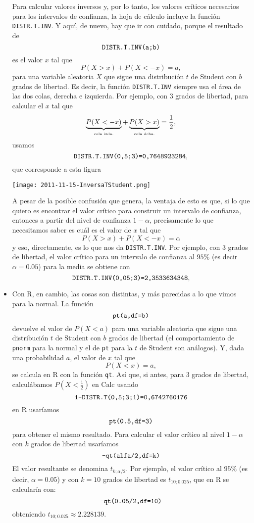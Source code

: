 \begin{itemize}
         Para calcular valores inversos y, por lo tanto, los valores críticos necesarios para los intervalos de confianza, la hoja de cálculo incluye la función {\tt DISTR.T.INV}. Y aquí, de nuevo, hay que ir con cuidado, porque el resultado de
         \[\mbox{\tt DISTR.T.INV(a;b)}\]
         es el valor $x$ tal que
         \[P(X>x)+P(X<-x)=a,\]
         para una variable aleatoria $X$ que sigue una distribución $t$ de Student con $b$ grados de libertad. Es decir, la función {\tt DISTR.T.INV} {\sf siempre usa el área de las dos colas, derecha e izquierda}. Por ejemplo,
         con 3 grados de libertad, para calcular el $x$ tal que
         \[\underbrace{P(X<-x)}_{\mbox{\tiny cola izda.}}+\underbrace{P(X>x)}_{\mbox{\tiny cola dcha.}}=\frac{1}{2},\]
         usamos
         \[\mbox{\tt DISTR.T.INV(0,5;3)=0,7648923284},\]
         que corresponde a esta figura
         \begin{center}
         \texttt{[image: 2011-11-15-InversaTStudent.png]}
         \end{center}
         A pesar de la posible confusión que genera, la ventaja de esto es que, si lo que quiero es encontrar el valor crítico para construir un intervalo de confianza, entonces a partir del nivel de confianza $1-\alpha$, precisamente lo que necesitamos saber es cuál es el valor de $x$ tal que
         \[P(X>x)+P(X<-x)=\alpha\]
         y eso, directamente, es lo que nos da {\tt DISTR.T.INV}. Por ejemplo, con $3$ grados de libertad, el valor crítico para un intervalo de confianza al $95\%$ (es decir $\alpha=0.05$) para la media se obtiene con
         \[\mbox{\tt DISTR.T.INV(0,05;3)=2,3533634348},\]


         \item Con R, en cambio, las cosas son distintas, y más parecidas a lo que vimos para la normal. La función
         \[\mbox{{\tt pt(a,df=b)}}\]
         devuelve el valor de $P(X<a)$ para una variable aleatoria que sigue una distribución $t$ de Student con $b$ grados de libertad (el comportamiento de {\tt pnorm} para la normal y el de {\tt pt} para la $t$ de Student son análogos).  Y, dada una probabilidad $a$, el valor de $x$ tal que
         \[P(X<x)=a,\]
         se calcula en R con la función {\tt qt}.  Así que, si antes, para $3$ grados de libertad, calculábamos $P(X<\frac{1}{2})$ en Calc usando
         \[\mbox{\tt 1-DISTR.T(0,5;3;1)=0,6742760176}\]
         en R usaríamos
         \[\mbox{\tt pt(0.5,df=3)}\]
         para obtener el mismo resultado. Para calcular el valor crítico al nivel $1-\alpha$ con $k$ grados de libertad usaríamos
         \[\mbox{\tt  -qt(alfa/2,df=k)}\]
         El valor resultante se denomina $t_{k;\alpha/2}$. Por ejemplo, el valor crítico al $95\%$ (es decir, $\alpha=0.05$) y con $k=10$ grados de libertad es $t_{10;0.025}$, que en R se calcularía con:
         \[\mbox{\tt  -qt(0.05/2,df=10)}\]
         obteniendo  $t_{10;0.025}\approx 2.228139$.

       \end{itemize}

